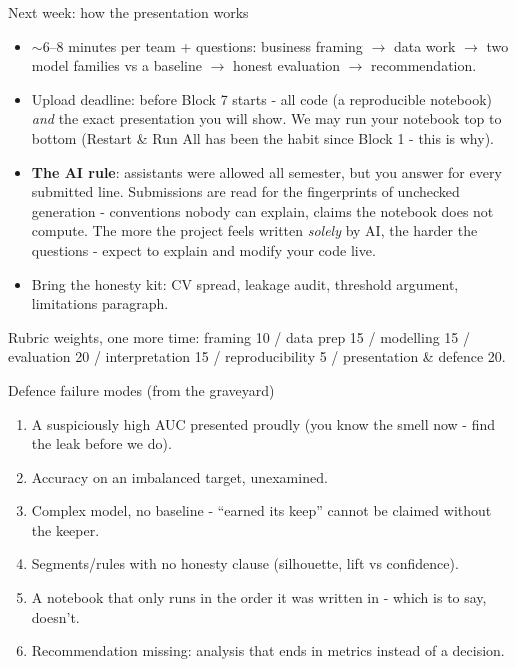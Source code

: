 \documentclass[10pt,aspectratio=169]{beamer}
\begin{document}
\begin{frame}{Next week: how the presentation works}
  \begin{itemize}
    \item \alert{$\sim$6--8 minutes per team} + questions: business framing
          $\to$ data work $\to$ two model families vs a baseline $\to$
          honest evaluation $\to$ recommendation.
    \item \alert{Upload deadline: before Block 7 starts} - all code (a
          reproducible notebook) \emph{and} the exact presentation you will
          show. We may run your notebook top to bottom (Restart \& Run All
          has been the habit since Block 1 - this is why).
    \item \textbf{The AI rule}: assistants were allowed all semester, but
          you answer for every submitted line. Submissions are read for
          the fingerprints of \alert{unchecked generation} - conventions
          nobody can explain, claims the notebook does not compute. The
          more the project feels written \emph{solely} by AI, the
          \alert{harder the questions} - expect to explain and modify
          your code live.
    \item Bring the \alert{honesty kit}: CV spread, leakage audit,
          threshold argument, limitations paragraph.
  \end{itemize}
  \vspace{0.3em}
  \begin{center}\small
    Rubric weights, one more time: framing 10 / data prep 15 / modelling
    15 / evaluation 20 / interpretation 15 / reproducibility 5 /
    \alert{presentation \& defence 20}.
  \end{center}
\end{frame}

\begin{frame}{Defence failure modes (from the graveyard)}
  \begin{enumerate}
    \item A suspiciously high AUC presented \alert{proudly} (you know the
          smell now - find the leak before we do).
    \item Accuracy on an imbalanced target, unexamined.
    \item Complex model, no baseline - ``earned its keep'' cannot be
          claimed without the keeper.
    \item Segments/rules with no honesty clause (silhouette, lift vs
          confidence).
    \item A notebook that only runs in the order it was written in -
          which is to say, doesn't.
    \item Recommendation missing: analysis that ends in metrics instead of
          \alert{a decision}.
  \end{enumerate}
\end{frame}
\end{document}
